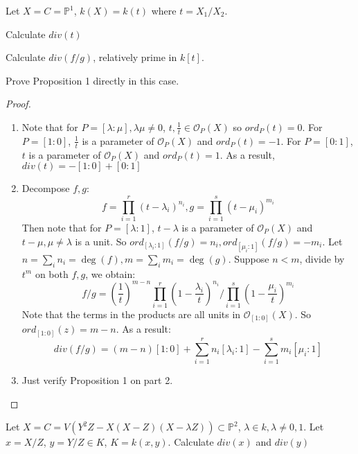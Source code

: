 \documentclass{solution}
\begin{document}
\begin{problem}{8.1}
    Let $X = C = \mathbb{P}^1$, $k(X) = k(t)$ where $t = X_1 / X_2$. \begin{inparaenum}
        \item Calculate $div(t)$
        \item Calculate $div(f / g)$, relatively prime in $k[t]$.
        \item Prove Proposition 1 directly in this case.
    \end{inparaenum}
\end{problem}

\begin{proof}
    \begin{enumerate}
        \item Note that for $P = [\lambda:\mu], \lambda \mu \ne 0$, $t, \frac{1}{t} \in \mathcal{O}_{P}(X)$ so $ord_P(t) = 0$. For $P = [1:0]$, $\frac{1}{t}$ is a parameter of $\mathcal{O}_{P}(X)$ and $ord_P(t) = -1$. For $P = [0:1]$, $t$ is a parameter of $\mathcal{O}_{P}(X)$ and $ord_P(t) = 1$. As a result, $div(t) = -[1:0] + [0:1]$
        \item Decompose $f, g$:
        $$f = \prod\limits_{i = 1}^{r} (t - \lambda_i)^{n_i}, g = \prod\limits_{i = 1}^{s} (t - \mu_i)^{m_i}$$
        Then note that for $P = [\lambda:1]$, $t - \lambda$ is a parameter of $\mathcal{O}_{P}(X)$ and $t - \mu, \mu \ne \lambda$ is a unit. So $ord_{[\lambda_i:1]}(f / g) = n_i, ord_{[\mu_i:1]}(f / g) = -m_i$.
        Let $n = \sum\limits_{i} n_i = \deg(f), m = \sum\limits_{i} m_i = \deg(g)$. Suppose $n \lt m$, divide by $t^m$ on both $f, g$, we obtain:
        $$f / g = \left(\frac{1}{t}\right)^{m - n} \prod\limits_{i = 1}^{r} (1 - \frac{\lambda_i}{t})^{n_i} / \prod\limits_{i = 1}^{s} (1 - \frac{\mu_i}{t})^{m_i}$$
        Note that the terms in the products are all units in $\mathcal{O}_{[1:0]}(X)$. So $ord_{[1:0]}(z) = m - n$.
        As a result:
        $$div(f / g) = (m - n)[1:0] + \sum\limits_{i = 1}^{r} n_i[\lambda_i:1] - \sum\limits_{i = 1}^{s} m_i[\mu_i:1]$$
        \item Just verify Proposition 1 on part 2.
    \end{enumerate}
\end{proof}

\begin{problem}{8.2}
    Let $X = C = V(Y^2Z - X(X - Z)(X - \lambda Z)) \subset \mathbb{P}^2$, $\lambda \in k, \lambda \ne 0, 1$. Let $x = X / Z$, $y = Y / Z \in K$, $K = k(x, y)$. Calculate $div(x)$ and $div(y)$
\end{problem}
\end{document}
